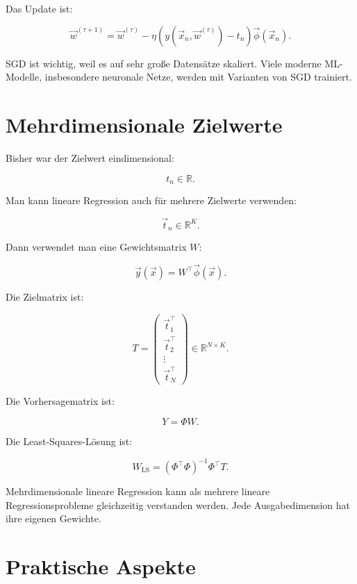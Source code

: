 Das Update ist:

\[
    \vec{w}^{(\tau+1)}
    =
    \vec{w}^{(\tau)}
    -
    \eta
    \left(
        y(\vec{x}_n,\vec{w}^{(\tau)})-t_n
    \right)
    \vec{\phi}(\vec{x}_n).
\]

\begin{conceptbox}
SGD ist wichtig, weil es auf sehr große Datensätze skaliert.
Viele moderne ML-Modelle, insbesondere neuronale Netze, werden mit Varianten von SGD trainiert.
\end{conceptbox}

\section{Mehrdimensionale Zielwerte}

Bisher war der Zielwert eindimensional:

\[
    t_n \in \mathbb{R}.
\]

Man kann lineare Regression auch für mehrere Zielwerte verwenden:

\[
    \vec{t}_n \in \mathbb{R}^K.
\]

Dann verwendet man eine Gewichtsmatrix \(W\):

\[
    \vec{y}(\vec{x})
    =
    W^{\top}\vec{\phi}(\vec{x}).
\]

Die Zielmatrix ist:

\[
    T
    =
    \begin{pmatrix}
        \vec{t}_1^{\top} \\
        \vec{t}_2^{\top} \\
        \vdots \\
        \vec{t}_N^{\top}
    \end{pmatrix}
    \in \mathbb{R}^{N \times K}.
\]

Die Vorhersagematrix ist:

\[
    Y
    =
    \Phi W.
\]

Die Least-Squares-Lösung ist:

\[
    W_{\mathrm{LS}}
    =
    (\Phi^{\top}\Phi)^{-1}
    \Phi^{\top}T.
\]

\begin{notebox}
Mehrdimensionale lineare Regression kann als mehrere lineare Regressionsprobleme gleichzeitig verstanden werden.
Jede Ausgabedimension hat ihre eigenen Gewichte.
\end{notebox}

\section{Praktische Aspekte}

